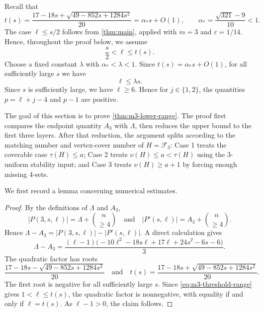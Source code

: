 \documentclass[10pt,a4paper]{article}
\numberwithin{equation}{section}
\newtheorem{lemma}[lemma]{Lemma}
\theoremstyle{definition}
\newcommand{\F}{\mathcal F}
\newcommand{\eps}{\varepsilon}
\begin{document}
Recall that
\[
    t(s)
    =
    \frac{17-18s+\sqrt{49-852s+1284s^2}}{20}
    =\alpha_*s+O(1),
    \qquad
    \alpha_*=\frac{\sqrt{321}-9}{10}<1.
\]
The case \(\ell\le s/2\) follows from \cref{thm:main}, applied with
\(m=3\) and \(\eps=1/14\).
Hence, throughout the proof below, we assume
\begin{equation}\label{eq:m3-threshold-range}
    \frac s2<\ell\le t(s).
\end{equation}
Choose a fixed constant \(\lambda\) with \(\alpha_*<\lambda<1\).  Since
\(t(s)=\alpha_*s+O(1)\), for all sufficiently large \(s\) we have
\begin{equation}\label{eq:m3-lambda-range}
    \ell\le \lambda s.
\end{equation}
Since $s$ is sufficiently large, we have $\ell\ge6$.
Hence for \(j\in\{1,2\}\), the quantities \(p=\ell+j-4\) and \(p-1\) are positive.

The goal of this section is to prove \cref{thm:m3-lower-range}.  The proof
first compares the endpoint quantity \(A_3\) with \(\Lambda\), then reduces
the upper bound to the first three layers.  After that reduction, the argument
splits according to the matching number and vertex-cover number of
\(H=\F_3\): Case 1 treats the coverable case \(\tau(H)\le a\); Case 2
treats \(\nu(H)\le a<\tau(H)\) using the 3-uniform stability input; and
Case 3 treats \(\nu(H)\ge a+1\) by forcing enough missing 4-sets.

We first record a lemma concerning numerical estimates.
\begin{proof}
    By the definitions of \(\Lambda\) and \(A_3\),
    \[
        |P(3,s,\ell)|=\Lambda+\binom n{\ge4}
        \quad\text{and}\quad
        |P'(s,\ell)|=A_3+\binom n{\ge4}.
    \]
    Hence
    \(\Lambda-A_3=|P(3,s,\ell)|-|P'(s,\ell)|\).
    A direct calculation gives
    \[
        \Lambda-A_3
        =
        \frac{(\ell-1)\bigl(-10\ell^2-18s\ell+17\ell+24s^2-6s-6\bigr)}{3}.
    \]
    The quadratic factor has roots
    \[
        \frac{17-18s-\sqrt{49-852s+1284s^2}}{20}
        \quad\text{and}\quad
        t(s)=\frac{17-18s+\sqrt{49-852s+1284s^2}}{20}.
    \]
    The first root is negative for all sufficiently large \(s\).
    Since \eqref{eq:m3-threshold-range} gives \(1<\ell\le t(s)\),
    the quadratic factor is nonnegative, with equality if and only if
    \(\ell=t(s)\).  As \(\ell-1>0\), the claim follows.
\end{proof}
\end{document}
